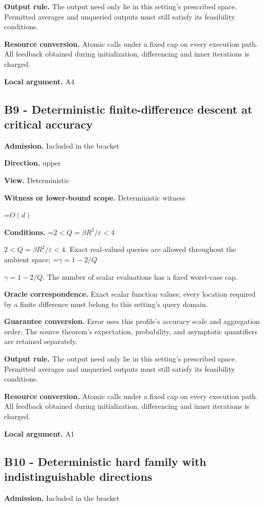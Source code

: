 \documentclass[10pt,a4paper]{article}
\newcommand{\AtlasMath}[1]{\par\begingroup\centering\setbox0=\hbox{$\displaystyle #1$}\ifdim\wd0>1.4\linewidth\typeout{ATLAS WIDE FORMULA: \the\wd0}\fi\ifdim\wd0>\linewidth\resizebox{\linewidth}{!}{\box0}\else\box0\fi\par\endgroup}
\newcommand{\AtlasInlineMath}[1]{\begingroup\setbox0=\hbox{$#1$}\ifdim\wd0>.4\linewidth\endgroup\AtlasMath{#1}\else\endgroup$#1$\fi}
\begin{document}
\textbf{Output rule.} The output need only lie in this setting's prescribed space. Permitted averages and unqueried outputs must still satisfy its feasibility conditions.

\textbf{Resource conversion.} Atomic calls under a fixed cap on every execution path. All feedback obtained during initialization, differencing and inner iterations is charged.

\textbf{Local argument.} A4

\subsection{B9 - Deterministic finite-difference descent at critical accuracy}
\textbf{Admission.} Included in the bracket

\textbf{Direction.} upper

\textbf{View.} Deterministic

\textbf{Witness or lower-bound scope.} Deterministic witness

\AtlasMath{O(d)}
\textbf{Conditions.} \AtlasInlineMath{2<Q=\beta R^2/\varepsilon<4}. Exact real-valued queries are allowed throughout the ambient space; \AtlasInlineMath{\gamma=1-2/Q}. The number of scalar evaluations has a fixed worst-case cap.

\textbf{Oracle correspondence.} Exact scalar function values; every location required by a finite difference must belong to this setting's query domain.

\textbf{Guarantee conversion.} Error uses this profile's accuracy scale and aggregation order. The source theorem's expectation, probability, and asymptotic quantifiers are retained separately.

\textbf{Output rule.} The output need only lie in this setting's prescribed space. Permitted averages and unqueried outputs must still satisfy its feasibility conditions.

\textbf{Resource conversion.} Atomic calls under a fixed cap on every execution path. All feedback obtained during initialization, differencing and inner iterations is charged.

\textbf{Local argument.} A1

\subsection{B10 - Deterministic hard family with indistinguishable directions}
\textbf{Admission.} Included in the bracket
\end{document}

